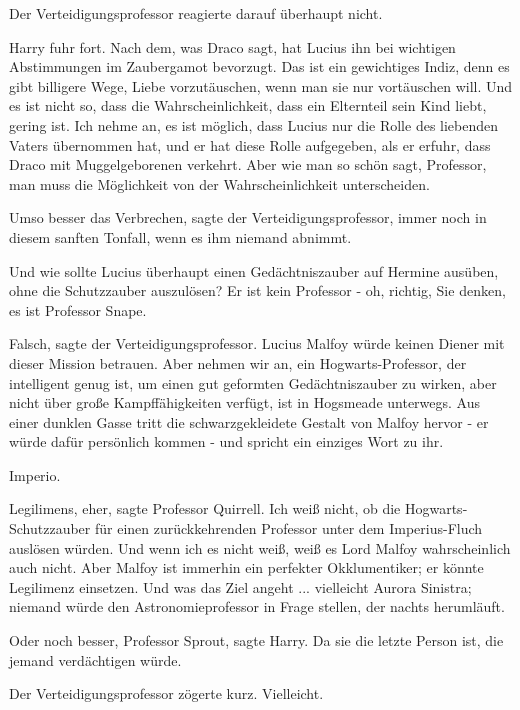 Der Verteidigungsprofessor reagierte darauf überhaupt nicht.

Harry fuhr fort. \glqq{}Nach dem, was Draco sagt, hat Lucius ihn bei wichtigen
Abstimmungen im Zaubergamot bevorzugt. Das ist ein gewichtiges Indiz, denn es
gibt billigere Wege, Liebe vorzutäuschen, wenn man sie nur vortäuschen will. Und
es ist nicht so, dass die Wahrscheinlichkeit, dass ein Elternteil sein Kind
liebt, gering ist. Ich nehme an, es ist möglich, dass Lucius nur die Rolle des
liebenden Vaters übernommen hat, und er hat diese Rolle aufgegeben, als er
erfuhr, dass Draco mit Muggelgeborenen verkehrt. Aber wie man so schön sagt,
Professor, man muss die Möglichkeit von der Wahrscheinlichkeit
unterscheiden.\grqq{}

\glqq{}Umso besser das Verbrechen\grqq{}, sagte der Verteidigungsprofessor, immer
noch in diesem sanften Tonfall, \glqq{}wenn es ihm niemand abnimmt.\grqq{}

\glqq{}Und wie sollte Lucius überhaupt einen Gedächtniszauber auf Hermine
ausüben, ohne die Schutzzauber auszulösen? Er ist kein Professor - oh, richtig,
Sie denken, es ist Professor Snape.\grqq{}

\glqq{}Falsch\grqq{}, sagte der Verteidigungsprofessor. \glqq{}Lucius Malfoy würde
keinen Diener mit dieser Mission betrauen. Aber nehmen wir an, ein
Hogwarts-Professor, der intelligent genug ist, um einen gut geformten
Gedächtniszauber zu wirken, aber nicht über große Kampffähigkeiten verfügt, ist
in Hogsmeade unterwegs. Aus einer dunklen Gasse tritt die schwarzgekleidete
Gestalt von Malfoy hervor - er würde dafür persönlich kommen - und spricht ein
einziges Wort zu ihr.\grqq{}

\glqq{}Imperio.\grqq{}

\glqq{}Legilimens, eher\grqq{}, sagte Professor Quirrell. \glqq{}Ich weiß nicht,
ob die Hogwarts-Schutzzauber für einen zurückkehrenden Professor unter dem
Imperius-Fluch auslösen würden. Und wenn ich es nicht weiß, weiß es Lord Malfoy
wahrscheinlich auch nicht. Aber Malfoy ist immerhin ein perfekter Okklumentiker;
er könnte Legilimenz einsetzen. Und was das Ziel angeht ... vielleicht Aurora
Sinistra; niemand würde den Astronomieprofessor in Frage stellen, der nachts
herumläuft.\grqq{}

\glqq{}Oder noch besser, Professor Sprout\grqq{}, sagte Harry. \glqq{}Da sie die
letzte Person ist, die jemand verdächtigen würde.\grqq{}

Der Verteidigungsprofessor zögerte kurz. \glqq{}Vielleicht.\grqq{}

